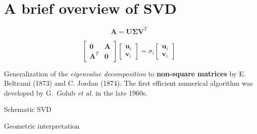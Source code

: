 \documentclass[aspectratio=169]{beamer}
\begin{document}
\section{A brief overview of SVD}
\begin{frame}
  \sectionpage
\end{frame}

\begin{frame}
  \vfill

  
  \begin{tcolorbox}[
    enhanced,
    coltitle=black,
    coltext=white,
    colback=black,
    title=\textbf{Singular value decomposition},
    frame style tile={width=\paperwidth}{background.jpg}
    ]

    \begin{overprint}

      \large
      \[
      \bm{A} = \bm{U} \boldsymbol{\Sigma} \bm{V}^T
      \]

      \large
      \[
      \begin{bmatrix}
        \bm{0} & \bm{A} \\
        \bm{A}^T & \bm{0}
      \end{bmatrix}
      \begin{bmatrix}
        \bm{u}_i \\ \bm{v}_i
      \end{bmatrix}
      =
      \sigma_i
      \begin{bmatrix}
        \bm{u}_i \\ \bm{v}_i
      \end{bmatrix}
      \]

    \end{overprint}
  \end{tcolorbox}

  \bigskip
  
  Generalization of the \emph{eigenvalue decomposition} to \textbf{non-square matrices} by E. Beltrami (1873) and C. Jordan (1874).
  The first efficient numerical algorithm was developed by G.\ Golub \emph{et al.} in the late 1960s.
  
  \vfill
\end{frame}

\begin{frame}
  Schematic SVD
\end{frame}

\begin{frame}{Geometric interpretation}

\end{frame}
\end{document}
